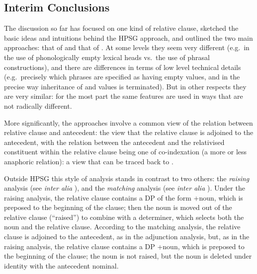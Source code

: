 \documentclass[output=paper,biblatex,babelshorthands,newtxmath,draftmode,colorlinks,citecolor=brown]{langscibook}
\begin{document}
\subsection{Interim Conclusions}
\label{sec:rc-interim-conclusions}
The discussion so far has focused on one kind of relative clause, sketched the basic ideas
and intuitions behind the HPSG approach, and outlined the two main approaches:
that of \citet{Pollard:Sag:94} and that of \citet{Sag:97}. At some levels they seem very
different (e.g.\ in the use of phonologically empty lexical heads vs.\ the use of phrasal constructions), and there
are differences in terms of low level technical details (e.g.\ precisely which
phrases are specified as having empty  values, and in the precise way
inheritance of  and  values is terminated). But in other respects they are
very similar: for the most part the same features are used in ways that are not radically
different.

More significantly, the approaches involve a common view of the relation between relative
clause and antecedent: the view that the relative clause is adjoined to the antecedent,
with the relation between the antecedent and the relativised constituent within the
relative clause being one of co-indexation (a more or less anaphoric relation): a view
that can be traced back to .

Outside HPSG this style of analysis stands in contrast to two others: the \emph{raising}
analysis (see \emph{inter alia} \textcites{Schachter73a-u}{Vergnaud74a-u}[Section~8.2--8.4]{Kayne94a-u}), and the
\emph{matching} analysis (see \emph{inter alia} \cites[137--138]{Chomsky65a}{Lees61Constituent}[Section~2.4]{Sauerland98MeaninChain}). Under the raising analysis, the relative clause contains a DP of the
form +noun, which is preposed to the beginning of the clause; then the noun is
moved out of the relative clause (``raised'') to combine with a determiner, which selects
both the noun and the relative clause. According to the matching analysis, the relative clause is adjoined to the antecedent, as in the adjunction analysis, but, as in the
raising analysis, the relative clause contains a
DP +noun, which is preposed to the beginning of the clause; the noun is not
raised, but the noun is deleted under identity with the antecedent nominal.
\end{document}
